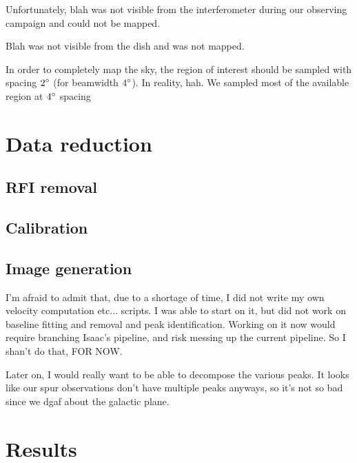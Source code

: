 \documentclass[10pt]{article}
\begin{document}
Unfortunately, blah was not visible from the interferometer during our observing campaign and could not be mapped.

Blah was not visible
from the dish and was not mapped.

In order to completely map the sky, the region of interest should be sampled with spacing $2\degree$ (for beamwidth $4\degree$).  In reality, hah.  We sampled most of the available region at $4\degree$ spacing

\section{Data reduction}

\subsection{RFI removal}

\subsection{Calibration}


\subsection{Image generation}

I'm afraid to admit that, due to a shortage of time, I did not write my own
velocity computation etc... scripts.  I was able to start on it, but did not
work on baseline fitting and removal and peak identification.  Working on it
now would require branching Isaac's pipeline, and risk messing up the current
pipeline.  So I shan't do that, FOR NOW.

Later on, I would really want to be able to decompose the various peaks.  It
looks like our spur observations don't have multiple peaks anyways, so it's not
so bad since we dgaf about the galactic plane.

\section{Results}
\end{document}
